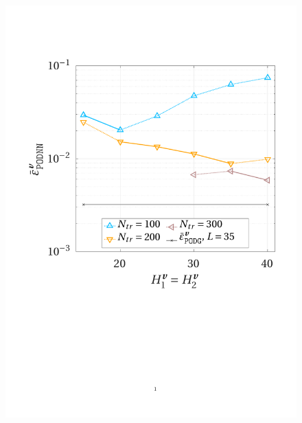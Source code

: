 \documentclass[12pt, a4paper, twoside, openright, notitlepage]{report}
\numberwithin{equation}{chapter}
\theoremstyle{theorem}
\theoremstyle{definition}
\theoremstyle{remark}
\theoremstyle{proposition}
\numberwithin{figure}{chapter}
\begin{document}
\begin{figure}[H]
			\center
			\vspace*{-0.3cm}
			\includegraphics[scale = 0.37, trim = {1cm 9cm 1.5cm 3.5cm}, clip]{dc_400_vel_nn_convergence}
			\hspace*{0.6cm}

\end{figure}
\end{document}
